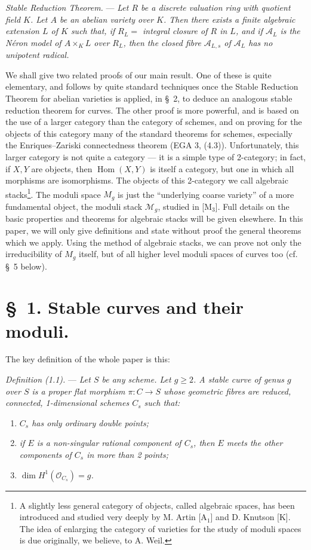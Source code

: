 \documentclass[10pt]{article}
\newcommand{\Hom}{\operatorname{Hom}}
\newcommand{\cO}{\mathcal O}
\newcommand{\cA}{\mathcal A}
\begin{document}
\medskip
\noindent\textit{Stable Reduction Theorem.} --- \textit{Let $R$ be a discrete valuation ring with quotient field $K$. Let $A$ be an abelian variety over $K$. Then there exists a finite algebraic extension $L$ of $K$ such that, if $R_L={}$ integral closure of $R$ in $L$, and if $\cA_L$ is the Néron model of $A\times_K L$ over $R_L$, then the closed fibre $\cA_{L,s}$ of $\cA_L$ has no unipotent radical.}

We shall give two related proofs of our main result. One of these is quite elementary, and follows by quite standard techniques once the Stable Reduction Theorem for abelian varieties is applied, in \S~2, to deduce an analogous stable reduction theorem for curves. The other proof is more powerful, and is based on the use of a larger category than the category of schemes, and on proving for the objects of this category many of the standard theorems for schemes, especially the Enriques--Zariski connectedness theorem (EGA 3, (4.3)). Unfortunately, this larger category is not quite a category --- it is a simple type of 2-category; in fact, if $X,Y$ are objects, then $\Hom(X,Y)$ is itself a category, but one in which all morphisms are isomorphisms. The objects of this 2-category we call algebraic stacks\footnote{A slightly less general category of objects, called algebraic spaces, has been introduced and studied very deeply by M. Artin [A$_1$] and D. Knutson [K]. The idea of enlarging the category of varieties for the study of moduli spaces is due originally, we believe, to A. Weil.}. The moduli space $M_g$ is just the ``underlying coarse variety'' of a more fundamental object, the moduli stack $\mathcal M_g$, studied in [M$_3$]. Full details on the basic properties and theorems for algebraic stacks will be given elsewhere. In this paper, we will only give definitions and state without proof the general theorems which we apply. Using the method of algebraic stacks, we can prove not only the irreducibility of $M_g$ itself, but of all higher level moduli spaces of curves too (cf. \S~5 below).

\section*{\S~1. Stable curves and their moduli.}

The key definition of the whole paper is this:

\medskip
\noindent\textit{Definition (1.1).} --- \textit{Let $S$ be any scheme. Let $g\geq 2$. A stable curve of genus $g$ over $S$ is a proper flat morphism $\pi:C\to S$ whose geometric fibres are reduced, connected, 1-dimensional schemes $C_s$ such that:}
\begin{enumerate}[label=(\roman*)]
\item \textit{$C_s$ has only ordinary double points;}
\item \textit{if $E$ is a non-singular rational component of $C_s$, then $E$ meets the other components of $C_s$ in more than 2 points;}
\item \textit{$\dim H^1(\cO_{C_s})=g$.}
\end{enumerate}
\end{document}
